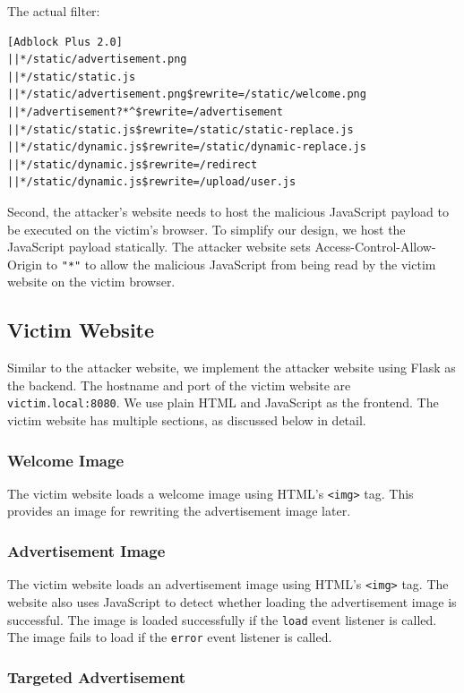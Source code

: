 \documentclass[conference]{IEEEtran}
\begin{document}
The actual filter: 

\begin{lstlisting}
[Adblock Plus 2.0]
||*/static/advertisement.png
||*/static/static.js
||*/static/advertisement.png$rewrite=/static/welcome.png
||*/advertisement?*^$rewrite=/advertisement
||*/static/static.js$rewrite=/static/static-replace.js
||*/static/dynamic.js$rewrite=/static/dynamic-replace.js
||*/static/dynamic.js$rewrite=/redirect
||*/static/dynamic.js$rewrite=/upload/user.js
\end{lstlisting}

Second, the attacker's website needs to host the malicious JavaScript payload to be executed on the victim's browser. To simplify our design, we host the JavaScript payload statically. The attacker website sets Access-Control-Allow-Origin to \lstinline{"*"} to allow the malicious JavaScript from being read by the victim website on the victim browser.

\subsection{Victim Website}

Similar to the attacker website, we implement the attacker website using Flask as the backend. The hostname and port of the victim website are \lstinline{victim.local:8080}. We use plain HTML and JavaScript as the frontend. The victim website has multiple sections, as discussed below in detail.

\subsubsection{Welcome Image}

The victim website loads a welcome image using HTML's \lstinline{<img>} tag. This provides an image for rewriting the advertisement image later.

\subsubsection{Advertisement Image}

The victim website loads an advertisement image using HTML's \lstinline{<img>} tag. The website also uses JavaScript to detect whether loading the advertisement image is successful. The image is loaded successfully if the \lstinline{load} event listener is called. The image fails to load if the \lstinline{error} event listener is called.

\subsubsection{Targeted Advertisement}
\end{document}
